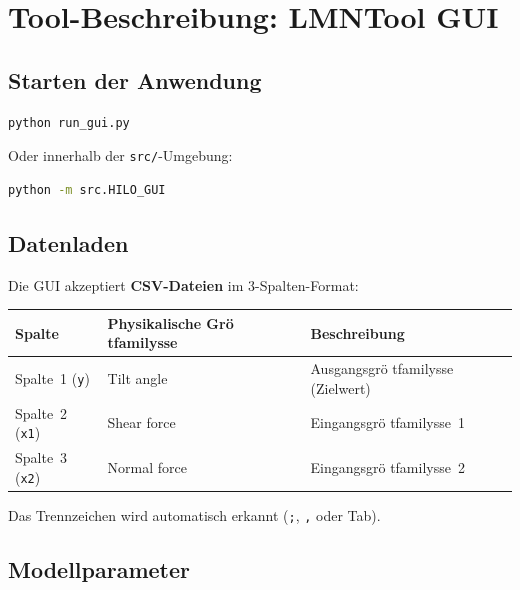 \documentclass[11pt,a4paper]{report}
\begin{document}
	\section{Tool-Beschreibung: LMNTool GUI}
	
	\subsection{Starten der Anwendung}
	
	\begin{lstlisting}[language=bash,caption={GUI starten}]
		python run_gui.py
	\end{lstlisting}
	
	Oder innerhalb der \texttt{src/}-Umgebung:
	
	\begin{lstlisting}[language=bash]
		python -m src.HILO_GUI
	\end{lstlisting}
	
	\subsection{Datenladen}
	
	Die GUI akzeptiert \textbf{CSV-Dateien} im 3-Spalten-Format:
	
	\begin{center}
		\begin{tabular}{lll}
			\toprule
			\textbf{Spalte} & \textbf{Physikalische Grö	tfamily{sse}} & \textbf{Beschreibung} \\
			\midrule
			Spalte~1 (\texttt{y}) & Tilt angle & Ausgangsgrö	tfamily{sse (Zielwert)} \\
			Spalte~2 (\texttt{x1}) & Shear force & Eingangsgrö	tfamily{sse~1} \\
			Spalte~3 (\texttt{x2}) & Normal force & Eingangsgrö	tfamily{sse~2} \\
			\bottomrule
		\end{tabular}
	\end{center}
	
	Das Trennzeichen wird automatisch erkannt (\texttt{;}, \texttt{,} oder Tab).
	
	\subsection{Modellparameter}
	
\end{document}
